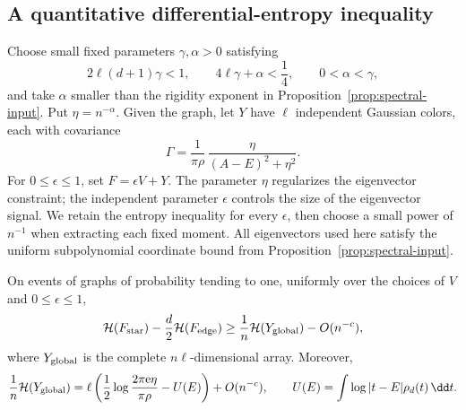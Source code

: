 \subsection{A quantitative differential-entropy inequality}

Choose small fixed parameters \(\gamma,\alpha>0\) satisfying
\begin{equation}\label{eq:ent-parameters}
 2\ell(d+1)\gamma<1,\qquad
 4\ell\gamma+\alpha<\frac14,\qquad
 0<\alpha<\gamma,
\end{equation}
and take \(\alpha\) smaller than the rigidity exponent in
Proposition~\ref{prop:spectral-input}. Put \(\eta=n^{-\alpha}\).
Given the graph, let \(Y\) have \(\ell\) independent Gaussian colors,
each with covariance
\begin{equation}\label{eq:ent-noise}
 \Gamma=\frac{1}{\pi\rho}\,
          \frac{\eta}{(A-E)^2+\eta^2}.
\end{equation}
For \(0\le\epsilon\le1\), set \(F=\epsilon V+Y\).
The parameter \(\eta\) regularizes the eigenvector constraint; the
independent parameter \(\epsilon\) controls the size of the eigenvector
signal. We retain the entropy inequality for every \(\epsilon\), then
choose a small power of \(n^{-1}\) when extracting each fixed moment.
All eigenvectors used here satisfy the uniform subpolynomial
coordinate bound from Proposition~\ref{prop:spectral-input}.

\begin{lemma}\label{ent:star-edge}
On events of graphs of probability tending to one, uniformly over the
choices of \(V\) and \(0\le\epsilon\le1\),
\begin{equation}\label{eq:ent-star-edge}
 \mathcal H(F_{\rm star})-\frac d2\mathcal H(F_{\rm edge})
 \ge \frac1n\mathcal H(Y_{\rm global})-O(n^{-c}),
\end{equation}
where \(Y_{\rm global}\) is the complete \(n\ell\)-dimensional array.
Moreover,
\begin{equation}\label{eq:ent-global-entropy}
 \frac1n\mathcal H(Y_{\rm global})
 =\ell\left(\frac12\log\frac{2\pi{\rm e}\eta}{\pi\rho}
                    -U(E)\right)+O(n^{-c}),
 \qquad
 U(E)=\int\log|t-E|\rho_d(t)\,\dd t .
\end{equation}
\end{lemma}

